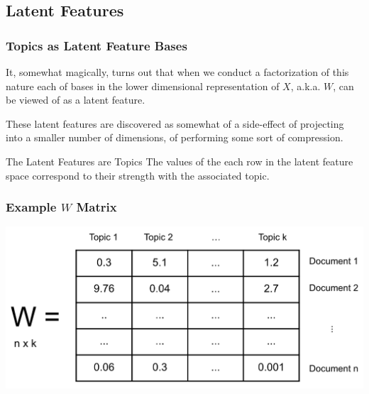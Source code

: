 \documentclass{beamer}
\begin{document}
\subsection{Latent Features}
\begin{frame}
  \frametitle{Topics as Latent Feature Bases}
  It, somewhat magically, turns out that when we conduct a factorization of this nature each of bases in the lower dimensional representation of $X$, a.k.a. $W$, can be viewed of as a latent feature. \vspace{4mm}

  These latent features are discovered as somewhat of a side-effect of projecting into a smaller number of dimensions, of performing some sort of compression. \vspace{2mm}

  \begin{block}{The Latent Features are Topics}
    The values of the each row in the latent feature space correspond to their strength with the associated topic.
  \end{block}
\end{frame}

\begin{frame}
  \frametitle{Example $W$ Matrix}
  \includegraphics[width=\textwidth]{images/w_matrix.png}
\end{frame}
\end{document}
